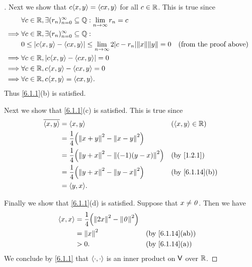 \begin{proof}[]
	Next we show that \(c \inn{x, y} = \inn{cx, y}\) for all \(c \in \mathbb{R}\).
	This is true since
	\begin{align*}
		         & \forall c \in \R, \exists (r_n)_{n = 0}^\infty \subseteq \Q : \lim_{n \to \infty} r_n = c                                                 \\
		\implies & \forall c \in \R, \exists (r_n)_{n = 0}^\infty \subseteq \Q :                                                                             \\
		         & 0 \leq \abs{c \inn{x, y} - \inn{cx, y}} \leq \lim_{n \to \infty} 2 \abs{c - r_n} \norm{x} \norm{y} = 0 &  & \text{(from the proof above)} \\
		\implies & \forall c \in \R, \abs{c \inn{x, y} - \inn{cx, y}} = 0                                                                                    \\
		\implies & \forall c \in \R, c \inn{x, y} - \inn{cx, y} = 0                                                                                          \\
		\implies & \forall c \in \R, c \inn{x, y} = \inn{cx, y}.
	\end{align*}
	Thus \cref{6.1.1}(b) is satisfied.

	Next we show that \cref{6.1.1}(c) is satisfied.
	This is true since
	\begin{align*}
		\conj{\inn{x, y}} & = \inn{x, y}                                              &  & (\inn{x, y} \in \R) \\
		                  & = \frac{1}{4} \pa{\norm{x + y}^2 - \norm{x - y}^2}                                 \\
		                  & = \frac{1}{4} \pa{\norm{y + x}^2 - \norm{(-1) (y - x)}^2} &  & \by{1.2.1}          \\
		                  & = \frac{1}{4} \pa{\norm{y + x}^2 - \norm{y - x}^2}        &  & \by{6.1.14}[b]      \\
		                  & = \inn{y, x}.
	\end{align*}

	Finally we show that \cref{6.1.1}(d) is satisfied.
	Suppose that \(x \neq \mathit{0}\).
	Then we have
	\begin{align*}
		\inn{x, x} & = \frac{1}{4} \pa{\norm{2x}^2 - \norm{\zv}^2}                      \\
		           & = \norm{x}^2                                  &  & \by{6.1.14}[ab] \\
		           & > 0.                                          &  & \by{6.1.14}[a]
	\end{align*}
	We conclude by \cref{6.1.1} that \(\left\langle\cdot, \cdot\right\rangle\) is an inner product on \(\mathsf{V}\) over \(\mathbb{R}\).
\end{proof}

